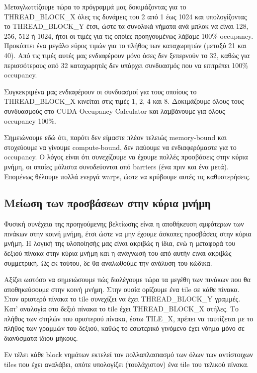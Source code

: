 \documentclass[titlepage]{article}
\begin{document}
Μεταγλωττίζουμε τώρα το πρόγραμμά μας δοκιμάζοντας για το THREAD\_BLOCK\_X όλες τις δυνάμεις του 2 από 1 έως 1024 και υπολογίζοντας το THREAD\_BLOCK\_Y έτσι, ώστε τα συνολικά νήματα ανά μπλοκ να είναι 128, 256, 512 ή 1024, ήτοι οι τιμές για τις οποίες προηγουμένως λάβαμε 100\% occupancy. Προκύπτει ένα μεγάλο εύρος τιμών για το πλήθος των καταχωρητών (μεταξύ 21 και 40). Από τις τιμές αυτές μας ενδιαφέρουν μόνο όσες δεν ξεπερνούν το 32, καθώς για περισσότερους από 32 καταχωρητές δεν υπάρχει συνδυασμός που να επιτρέπει 100\% occupancy.

Συγκεκριμένα μας ενδιαφέρουν οι συνδυασμοί για τους οποίους το THREAD\_BLOCK\_X κινείται στις τιμές 1, 2, 4 και 8. Δοκιμάζουμε όλους τους συνδυασμούς στο CUDA Occupancy Calculator και λαμβάνουμε για όλους occupancy 100\%.

Σημειώνουμε εδώ ότι, παρότι δεν είμαστε πλέον τελειώς memory-bound και στοχεύουμε να γίνουμε compute-bound, δεν παύουμε να ενδιαφερόμαστε για το occupancy. Ο λόγος είναι ότι συνεχίζουμε να έχουμε πολλές προσβάσεις στην κύρια μνήμη, οι οποίες μάλιστα συνοδεύονται από barriers (ένα πριν και ένα μετά). Επομένως θέλουμε πολλά ενεργά warps, ώστε να κρύβουμε αυτές τις καθυστερήσεις.

\subsection{Μείωση των προσβάσεων στην κύρια μνήμη}

Φυσική συνέχεια της προηγούμενης βελτίωσης είναι η αποθήκευση αμφότερων των πινάκων στην κοινή μνήμη, έτσι ώστε να μην έχουμε άσκοπες προσβάσεις στην κύρια μνήμη. Η λογική της υλοποίησής μας είναι ακριβώς η ίδια, ενώ η μεταφορά του δεξιού πίνακα στην κύρια μνήμη και η ανάγνωσή του από αυτήν ειναι ακριβώς συμμετρική. Ως εκ τούτου, δε θα αναλωθούμε την ανάλυση του κώδικα.

Αξίζει ωστόσο να σημειώσουμε πώς διαλέγουμε τώρα τα μεγέθη των πινάκων που θα αποθηκεύσουμε στην κοινή μνήμη. Στην ουσία ορίζουμε ένα tile σε κάθε πίνακα. Στον αριστερό πίνακα το tile συνεχίζει να έχει THREAD\_BLOCK\_Y γραμμές. Κατ' αναλογία στο δεξιό πίνακα το tile έχει THREAD\_BLOCK\_X στήλες. Το πλήθος των στηλών του αριστερού πίνακα, έστω TILE\_X, πρέπει να ταυτίζεται με το πλήθος των γραμμών του δεξιού, καθώς το εσωτερικό γινόμενο έχει νόημα μόνο σε διανύσματα ίδιου μήκους.

Εν τέλει κάθε block νημάτων εκτελεί τον πολλαπλασιασμό των όλων των αντίστοιχων tiles που έχει αναλάβει, οπότε υπολογίζει (τουλάχιστον) ένα tile του τελικού πίνακα.
\end{document}
